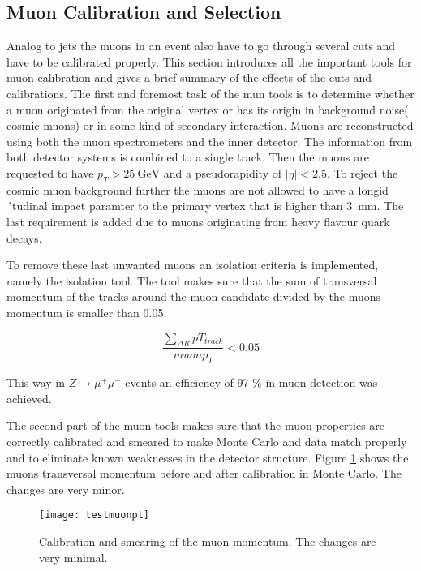 \subsection{Muon Calibration and Selection}

Analog to jets the muons in an event also have to go through several cuts and have to be calibrated properly. This section introduces all the important tools for muon calibration and gives a brief summary of the effects of the cuts and calibrations.
The first and foremost task of the mun tools is to determine whether a muon originated from the original vertex or has its origin in background noise( cosmic muons) or in some kind of secondary interaction. Muons are reconstructed using both the muon spectrometers and the inner detector. The information from both detector systems is combined to a single track. Then the muons are requested to have $p_T > \SI{25}{\GeV}$ and a pseudorapidity of $|\eta| < \num{2.5}$. To reject the cosmic muon background further the muons are not allowed to have a longid´tudinal impact paramter to the primary vertex that is higher than \SI{3}{\mm}. The last requirement is added due to muons originating from heavy flavour quark decays. 

To remove these last unwanted muons an isolation criteria is implemented, namely the isolation tool. The tool makes sure that the sum of transversal momentum of the tracks around the muon candidate divided by the muons momentum is smaller than \num{0.05}. 

\begin{equation}
\frac{\sum_{\Delta R}pT_{track}}{muon p_T} < 0.05
\end{equation}

This way in $Z \rightarrow \mu^+ \mu^-$ events an efficiency of \num{97} \% in muon detection was achieved.

The second part of the muon tools makes sure that the muon properties are correctly calibrated and smeared to make Monte Carlo and data match properly and to eliminate known weaknesses in the detector structure. Figure \ref{fig:testmuonpt} shows the muons transversal momentum before and after calibration in Monte Carlo. The changes are very minor.

\begin{figure}[h]
\centering
\texttt{[image: testmuonpt]}
\caption{Calibration and smearing of the muon momentum. The changes are very minimal.}
\label{fig:testmuonpt}
\end{figure}

